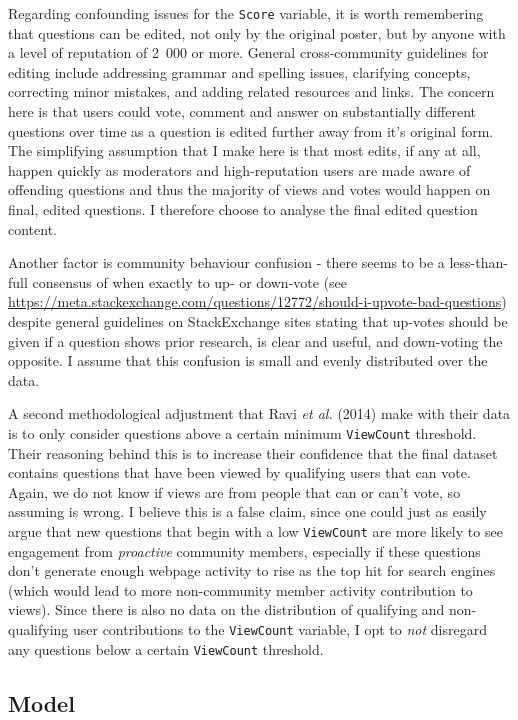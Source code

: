 \documentclass[11pt,preprint, authoryear]{article}
\numberwithin{equation}{section}
\begin{document}
Regarding confounding issues for the \texttt{Score} variable, it is
worth remembering that questions can be edited, not only by the original
poster, but by anyone with a level of reputation of 2~000 or more.
General cross-community guidelines for editing include addressing
grammar and spelling issues, clarifying concepts, correcting minor
mistakes, and adding related resources and links. The concern here is
that users could vote, comment and answer on substantially different
questions over time as a question is edited further away from it's
original form. The simplifying assumption that I make here is that most
edits, if any at all, happen quickly as moderators and high-reputation
users are made aware of offending questions and thus the majority of
views and votes would happen on final, edited questions. I therefore
choose to analyse the final edited question content.

Another factor is community behaviour confusion - there seems to be a
less-than-full consensus of when exactly to up- or down-vote (see
\url{https://meta.stackexchange.com/questions/12772/should-i-upvote-bad-questions})
despite general guidelines on StackExchange sites stating that up-votes
should be given if a question shows prior research, is clear and useful,
and down-voting the opposite. I assume that this confusion is small and
evenly distributed over the data.

A second methodological adjustment that Ravi \emph{et al.} (2014) make
with their data is to only consider questions above a certain minimum
\texttt{ViewCount} threshold. Their reasoning behind this is to increase
their confidence that the final dataset contains questions that have
been viewed by qualifying users that can vote. Again, we do not know if
views are from people that can or can't vote, so assuming is wrong. I
believe this is a false claim, since one could just as easily argue that
new questions that begin with a low \texttt{ViewCount} are more likely
to see engagement from \emph{proactive} community members, especially if
these questions don't generate enough webpage activity to rise as the
top hit for search engines (which would lead to more non-community
member activity contribution to views). Since there is also no data on
the distribution of qualifying and non-qualifying user contributions to
the \texttt{ViewCount} variable, I opt to \emph{not} disregard any
questions below a certain \texttt{ViewCount} threshold.

\newpage

\subsection{\texorpdfstring{Model \label{Model}}{Model }}\label{model}
\end{document}
